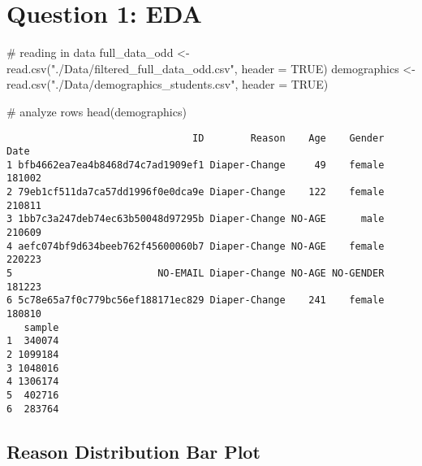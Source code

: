 \documentclass[
  letterpaper,
  DIV=11,
  numbers=noendperiod]{scrartcl}
\newenvironment{Shaded}{\begin{snugshade}}{\end{snugshade}}
\newcommand{\AttributeTok}[1]{\textcolor[rgb]{0.40,0.45,0.13}{#1}}
\newcommand{\CommentTok}[1]{\textcolor[rgb]{0.37,0.37,0.37}{#1}}
\newcommand{\ConstantTok}[1]{\textcolor[rgb]{0.56,0.35,0.01}{#1}}
\newcommand{\FunctionTok}[1]{\textcolor[rgb]{0.28,0.35,0.67}{#1}}
\newcommand{\NormalTok}[1]{\textcolor[rgb]{0.00,0.23,0.31}{#1}}
\newcommand{\OtherTok}[1]{\textcolor[rgb]{0.00,0.23,0.31}{#1}}
\newcommand{\SpecialCharTok}[1]{\textcolor[rgb]{0.37,0.37,0.37}{#1}}
\newcommand{\StringTok}[1]{\textcolor[rgb]{0.13,0.47,0.30}{#1}}
\begin{document}
\section{Question 1: EDA}\label{question-1-eda}

\begin{Shaded}
\begin{Highlighting}[]
\CommentTok{\# reading in data}
\NormalTok{full\_data\_odd }\OtherTok{\textless{}{-}} \FunctionTok{read.csv}\NormalTok{(}\StringTok{"./Data/filtered\_full\_data\_odd.csv"}\NormalTok{, }\AttributeTok{header =} \ConstantTok{TRUE}\NormalTok{)}
\NormalTok{demographics }\OtherTok{\textless{}{-}} \FunctionTok{read.csv}\NormalTok{(}\StringTok{"./Data/demographics\_students.csv"}\NormalTok{, }\AttributeTok{header =} \ConstantTok{TRUE}\NormalTok{)}
\end{Highlighting}
\end{Shaded}

\begin{Shaded}
\begin{Highlighting}[]
\CommentTok{\# analyze rows}
\FunctionTok{head}\NormalTok{(demographics)}
\end{Highlighting}
\end{Shaded}

\begin{verbatim}
                                ID        Reason    Age    Gender   Date
1 bfb4662ea7ea4b8468d74c7ad1909ef1 Diaper-Change     49    female 181002
2 79eb1cf511da7ca57dd1996f0e0dca9e Diaper-Change    122    female 210811
3 1bb7c3a247deb74ec63b50048d97295b Diaper-Change NO-AGE      male 210609
4 aefc074bf9d634beeb762f45600060b7 Diaper-Change NO-AGE    female 220223
5                         NO-EMAIL Diaper-Change NO-AGE NO-GENDER 181223
6 5c78e65a7f0c779bc56ef188171ec829 Diaper-Change    241    female 180810
   sample
1  340074
2 1099184
3 1048016
4 1306174
5  402716
6  283764
\end{verbatim}

\subsection{Reason Distribution Bar
Plot}\label{reason-distribution-bar-plot}

\begin{Shaded}
\end{Shaded}
\end{document}
